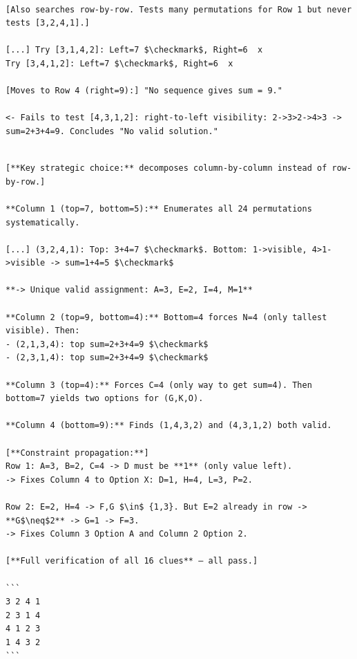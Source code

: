 \smallskip
\begin{tcolorbox}[
  enhanced, breakable, width=\linewidth,
  colback=orange!3, colframe=orange!50,
  title={\textbf{$RL_{individual}$}, incomplete row enumeration},
  fonttitle=\sffamily, coltitle=black
]

\begin{Verbatim}[fontsize=\footnotesize, breaklines, breakanywhere]

[Also searches row-by-row. Tests many permutations for Row 1 but never tests [3,2,4,1].]

[...] Try [3,1,4,2]: Left=7 $\checkmark$, Right=6  x 
Try [3,4,1,2]: Left=7 $\checkmark$, Right=6  x 

[Moves to Row 4 (right=9):] "No sequence gives sum = 9."

<- Fails to test [4,3,1,2]: right-to-left visibility: 2->3>2->4>3 -> sum=2+3+4=9. Concludes "No valid solution."

\end{Verbatim}
\end{tcolorbox}

\smallskip
\begin{tcolorbox}[
  enhanced, breakable, width=\linewidth,
  colback=green!3, colframe=green!75!black,
  title={\textbf{RACES}, column-wise decomposition with cascading propagation},
  fonttitle=\sffamily, coltitle=black
]
\begin{Verbatim}[fontsize=\footnotesize, breaklines, breakanywhere]

[**Key strategic choice:** decomposes column-by-column instead of row-by-row.]

**Column 1 (top=7, bottom=5):** Enumerates all 24 permutations systematically.

[...] (3,2,4,1): Top: 3+4=7 $\checkmark$. Bottom: 1->visible, 4>1->visible -> sum=1+4=5 $\checkmark$

**-> Unique valid assignment: A=3, E=2, I=4, M=1**

**Column 2 (top=9, bottom=4):** Bottom=4 forces N=4 (only tallest visible). Then:
- (2,1,3,4): top sum=2+3+4=9 $\checkmark$
- (2,3,1,4): top sum=2+3+4=9 $\checkmark$

**Column 3 (top=4):** Forces C=4 (only way to get sum=4). Then bottom=7 yields two options for (G,K,O).

**Column 4 (bottom=9):** Finds (1,4,3,2) and (4,3,1,2) both valid.

[**Constraint propagation:**]
Row 1: A=3, B=2, C=4 -> D must be **1** (only value left).
-> Fixes Column 4 to Option X: D=1, H=4, L=3, P=2.

Row 2: E=2, H=4 -> F,G $\in$ {1,3}. But E=2 already in row -> **G$\neq$2** -> G=1 -> F=3.
-> Fixes Column 3 Option A and Column 2 Option 2.

[**Full verification of all 16 clues** — all pass.]

```
3 2 4 1
2 3 1 4
4 1 2 3
1 4 3 2
```
\end{Verbatim}
\end{tcolorbox}